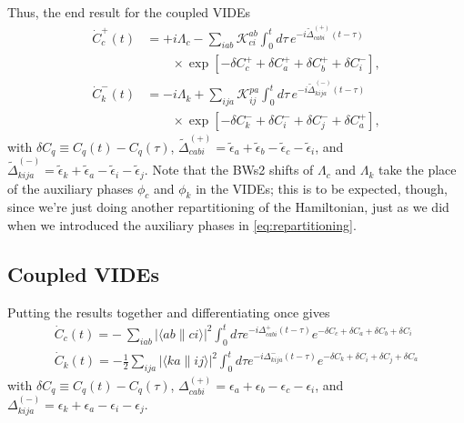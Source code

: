 Thus, the end result for the coupled VIDEs
\begin{align}
\dot C_c^+(t)
&=
+i\Lambda_c
-
\sum_{iab}
\mathcal{K}_{ci}^{ab}
\int_0^t d\tau\,
e^{-i\widetilde{\Delta}_{cabi}^{(+)}(t-\tau)}
\nonumber\\
&\qquad\times
\exp\left[
-\delta C_c^+
+\delta C_a^+
+\delta C_b^+
+\delta C_i^-
\right],
\\[2mm]
\dot C_k^-(t)
&=
-i\Lambda_k
+
\sum_{ija}
\mathcal{K}_{ij}^{pa}
\int_0^t d\tau\,
e^{-i\widetilde{\Delta}_{kija}^{(-)}(t-\tau)}
\nonumber\\
&\qquad\times
\exp\left[
-\delta C_k^-
+\delta C_i^-
+\delta C_j^-
+\delta C_a^+
\right],
\end{align}
with $\delta C_q\equiv C_q(t)-C_q(\tau)$, $\widetilde{\Delta}_{cabi}^{(+)}=\tilde{\epsilon}_a+\tilde{\epsilon}_b-\tilde{\epsilon}_c-\tilde{\epsilon}_i$, and $\widetilde{\Delta}_{kija}^{(-)}=\tilde{\epsilon}_k+\tilde{\epsilon}_a-\tilde{\epsilon}_i-\tilde{\epsilon}_j$. Note that the BWs2 shifts of $\Lambda_c$ and $\Lambda_k$ take the place of the auxiliary phases $\phi_c$ and $\phi_k$ in the VIDEs; this is to be expected, though, since we're just doing another repartitioning of the Hamiltonian, just as we did when we introduced the auxiliary phases in \ref{eq:repartitioning}. 
\subsection{Coupled VIDEs}
Putting the results together and differentiating once gives 
\begin{align}
    \dot{C}_c(t) =-\ \sum_{i a b}|\langle a b \| c i\rangle|^2 \int_0^t d \tau e^{-i \Delta_{cab i}^{+}(t-\tau)} e^{-\delta C_c+\delta C_a+\delta C_b+\delta C_i} \\
    \dot{C}_k(t) =-\frac{1}{2} \sum_{i j a}|\langle k a \| i j\rangle|^2 \int_0^t d \tau e^{-i \Delta_{kija}^{-}(t-\tau)} e^{-\delta C_k+\delta C_i+\delta C_j+\delta C_a}
\end{align}
with $\delta C_q\equiv C_q(t)-C_q(\tau)$, $\Delta_{cab i}^{(+)}=\epsilon_a+\epsilon_b-\epsilon_c-\epsilon_i$, and $\Delta_{kija}^{(-)}=\epsilon_k+\epsilon_a-\epsilon_i-\epsilon_j$.
